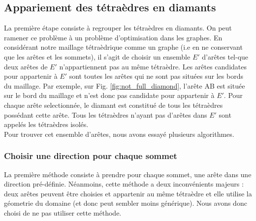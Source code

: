 \subsection{Appariement des tétraèdres en diamants}
\noindent
La première étape consiste à regrouper les tétraèdres en diamants. On peut ramener ce problème à un problème d'optimisation dans les graphes. En considérant notre maillage tétraèdrique comme un graphe (i.e en ne conservant que les arêtes et les sommets), il s'agit de choisir un ensemble $E'$ d'arêtes tel-que deux arêtes de $E'$ n'appartiennent pas au même tétraèdre. Les arêtes candidates pour appartenir à $E'$ sont toutes les arêtes qui ne sont pas situées sur les bords du maillage. Par exemple, sur Fig. \ref{fig:not_full_diamond}, l'arête AB est située sur le bord du maillage et n'est donc pas candidate pour appartenir à $E'$. Pour chaque arête selectionnée, le diamant est constitué de tous les tétraèdres possédant cette arête. Tous les tétraèdres n'ayant pas d'arêtes dans $E'$ sont appelés les tétraèdres isolés.\\
Pour trouver cet ensemble d'arêtes, nous avons essayé plusieurs algorithmes.
\subsubsection{Choisir une direction pour chaque sommet}
\noindent
La première méthode consiste à prendre pour chaque sommet, une arête dans une direction pré-définie. Néanmoins, cette méthode a deux inconvénients majeurs : deux arêtes peuvent être choisies et appartenir au même tétraèdre et elle utilise la géometrie du domaine (et donc peut sembler moins générique). Nous avons donc choisi de ne pas utiliser cette méthode.

